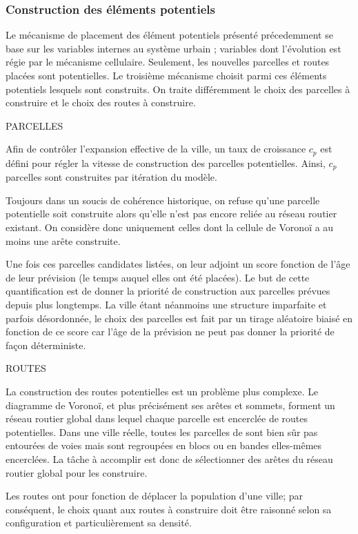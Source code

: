 \documentclass[12pt]{article}
\begin{document}
\subsubsection{Construction des éléments potentiels}

Le mécanisme de placement des élément potentiels présenté précedemment
se base sur les variables internes au système urbain ; variables dont
l'évolution est régie par le mécanisme cellulaire. Seulement, les
nouvelles parcelles et routes placées sont potentielles. Le troisième
mécanisme choisit parmi ces éléments potentiels lesquels sont
construits. On traite différemment le choix des parcelles à construire
et le choix des routes à construire.

PARCELLES

Afin de contrôler l'expansion effective de la ville, un taux de
croissance $c_p$ est défini pour régler la vitesse de construction des
parcelles potentielles. Ainsi, $c_p$ parcelles sont construites par
itération du modèle.

Toujours dans un soucis de cohérence historique, on refuse qu'une
parcelle potentielle soit construite alors qu'elle n'est pas encore
reliée au réseau routier existant. On considère donc uniquement celles
dont la cellule de Voronoï a au moins une arête construite.

Une fois ces parcelles candidates listées, on leur adjoint un score
fonction de l'âge de leur prévision (le temps auquel elles ont été
placées). Le but de cette quantification est de donner la priorité de
construction aux parcelles prévues depuis plus longtemps. La ville
étant néanmoins une structure imparfaite et parfois désordonnée, le
choix des parcelles est fait par un tirage aléatoire biaisé en
fonction de ce score car l'âge de la prévision ne peut pas donner la
priorité de façon déterministe.

ROUTES

La construction des routes potentielles est un problème plus
complexe. Le diagramme de Voronoï, et plus précisément ses arêtes et
sommets, forment un réseau routier global dans lequel chaque parcelle
est encerclée de routes potentielles. Dans une ville réelle, toutes
les parcelles de sont bien sûr pas entourées de voies mais sont
regroupées en blocs ou en bandes elles-mêmes encerclées. La tâche à
accomplir est donc de sélectionner des arêtes du réseau routier global
pour les construire.

Les routes ont pour fonction de déplacer la population d'une ville;
par conséquent, le choix quant aux routes à construire doit être
raisonné selon sa configuration et particulièrement sa densité.
\end{document}
